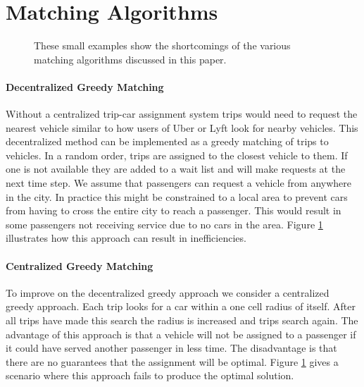 \documentclass[letterpaper]{article}
\begin{document}
\section{Matching Algorithms}

\begin{figure}

\hspace{2mm}
\label{exampleFigure}
\caption{These small examples show the shortcomings of the various matching algorithms discussed in this paper.}
\end{figure}

\paragraph{Decentralized Greedy Matching}
Without a centralized trip-car assignment system trips would need to request the nearest vehicle similar to how users of Uber or Lyft look for nearby vehicles. This decentralized method can be implemented as a greedy matching of trips to vehicles. In a random order, trips are assigned to the closest vehicle to them. If one is not available they are added to a wait list and will make requests at the next time step. We assume that passengers can request a vehicle from anywhere in the city. In practice this might be constrained to a local area to prevent cars from having to cross the entire city to reach a passenger. This would result in some passengers not receiving service due to no cars in the area. Figure \ref{exampleFigure} illustrates how this approach can result in inefficiencies.


\paragraph{Centralized Greedy Matching}
To improve on the decentralized greedy approach we consider a centralized greedy approach. Each trip looks for a car within a one cell radius of itself. After all trips have made this search the radius is increased and trips search again. The advantage of this approach is that a vehicle will not be assigned to a passenger if it could have served another passenger in less time. The disadvantage is that there are no guarantees that the assignment will be optimal. Figure \ref{exampleFigure} gives a scenario where this approach fails to produce the optimal solution.
\end{document}
